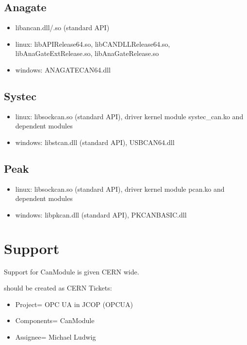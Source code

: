 \documentclass[letterpaper,10pt,english]{sphinxmanual}
\begin{document}
\section{Anagate}
\label{\detokenize{running:anagate}}\begin{itemize}
\item {} 
libancan.dll/.so  (standard API)

\item {} 
linux: libAPIRelease64.so, libCANDLLRelease64.so, libAnaGateExtRelease.so, libAnaGateRelease.so

\item {} 
windows: ANAGATECAN64.dll

\end{itemize}


\section{Systec}
\label{\detokenize{running:systec}}\begin{itemize}
\item {} 
linux: libsockcan.so (standard API), driver kernel module systec\_can.ko and dependent modules

\item {} 
windows: libstcan.dll (standard API), USBCAN64.dll

\end{itemize}


\section{Peak}
\label{\detokenize{running:peak}}\begin{itemize}
\item {} 
linux: libsockcan.so (standard API), driver kernel module pcan.ko and dependent modules

\item {} 
windows: libpkcan.dll (standard API), PKCANBASIC.dll

\end{itemize}


\chapter{Support}
\label{\detokenize{support:support}}\label{\detokenize{support::doc}}
Support for CanModule is given CERN wide.

 should be created as CERN  Tickets:
\begin{itemize}
\item {} 
Project= OPC UA in JCOP (OPCUA)

\item {} 
Components= CanModule

\item {} 
Assignee= Michael Ludwig

\end{itemize}
\end{document}
